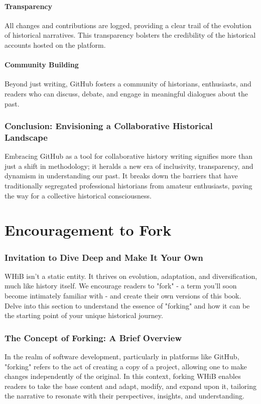 \documentclass{book}
\begin{document}
\subsubsection*{Transparency}
All changes and contributions are logged, providing a clear trail of the evolution of historical narratives. This transparency bolsters the credibility of the historical accounts hosted on the platform.

\subsubsection*{Community Building}
Beyond just writing, GitHub fosters a community of historians, enthusiasts, and readers who can discuss, debate, and engage in meaningful dialogues about the past.

\subsection*{Conclusion: Envisioning a Collaborative Historical Landscape}
Embracing GitHub as a tool for collaborative history writing signifies more than just a shift in methodology; it heralds a new era of inclusivity, transparency, and dynamism in understanding our past. It breaks down the barriers that have traditionally segregated professional historians from amateur enthusiasts, paving the way for a collective historical consciousness. 

\chapter{Encouragement to Fork}
\subsection*{Invitation to Dive Deep and Make It Your Own}
WHiB isn't a static entity. It thrives on evolution, adaptation, and diversification, much like history itself. We encourage readers to "fork" - a term you'll soon become intimately familiar with - and create their own versions of this book. Delve into this section to understand the essence of "forking" and how it can be the starting point of your unique historical journey.

\subsection*{The Concept of Forking: A Brief Overview}

In the realm of software development, particularly in platforms like GitHub, "forking" refers to the act of creating a copy of a project, allowing one to make changes independently of the original. In this context, forking WHiB enables readers to take the base content and adapt, modify, and expand upon it, tailoring the narrative to resonate with their perspectives, insights, and understanding.
\end{document}
